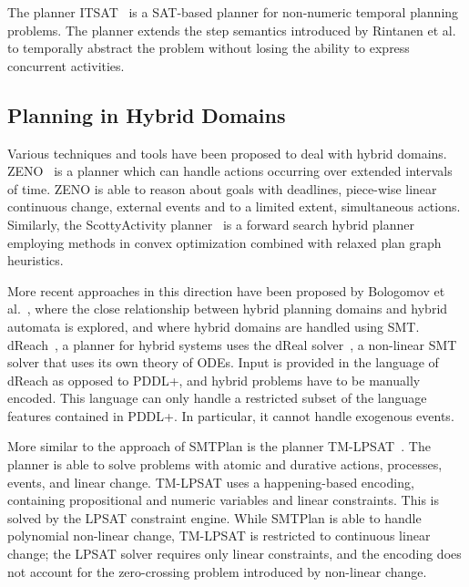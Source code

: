 The planner ITSAT~\cite{ran15} is a SAT-based planner for non-numeric temporal planning problems. The planner extends the step semantics introduced by Rintanen et al.~\cite{rin06} to temporally abstract the problem without losing the ability to express concurrent activities.

\subsection{Planning in Hybrid Domains}\label{sec:rel_hyb}

Various techniques and tools have been proposed to deal with hybrid domains. ZENO~\cite{zeno} is a planner which can handle actions occurring over extended intervals of time. ZENO is able to reason about goals with deadlines, piece-wise linear continuous change, external events and to a limited extent, simultaneous actions. Similarly, the ScottyActivity planner~\cite{fernandez2018scottyactivity} is a forward search hybrid planner employing methods in convex optimization combined with relaxed plan graph heuristics.

More recent approaches in this direction have been proposed by Bologomov et al.~\cite{bogomolov14}, where the close relationship between hybrid planning domains and hybrid automata is explored, and \cite{bryce} where hybrid domains are handled using SMT.
%
dReach~\cite{bryce}, a planner for hybrid systems uses the dReal solver~\cite{gao12}, a non-linear SMT solver that uses its own theory of ODEs. Input is provided in the language of dReach as opposed to PDDL+, and hybrid problems have to be manually encoded. This language can only handle a restricted subset of the language features contained in PDDL+. In particular, it cannot handle exogenous events.

More similar to the approach of SMTPlan is the planner TM-LPSAT~\cite{TM-LPSAT}. The planner is able to solve problems with atomic and durative actions, processes, events, and linear change. TM-LPSAT uses a happening-based encoding, containing propositional and numeric variables and linear constraints. This is solved by the LPSAT constraint engine. While SMTPlan is able to handle polynomial non-linear change, TM-LPSAT is restricted to continuous linear change; the LPSAT solver requires only linear constraints, and the encoding does not account for the zero-crossing problem introduced by non-linear change.


